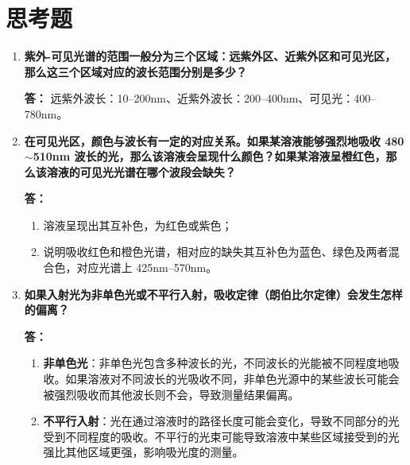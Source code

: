 \section{思考题}

\begin{enumerate}[label=\arabic*、, leftmargin=4em, labelsep=0pt]

    \item \textbf{紫外-可见光谱的范围一般分为三个区域：远紫外区、近紫外区和可见光区，那么这三个区域对应的波长范围分别是多少？}

    \textbf{答：} 远紫外波长：10--200nm、近紫外波长：200--400nm、可见光：400--780nm。

    \item \textbf{在可见光区，颜色与波长有一定的对应关系。如果某溶液能够强烈地吸收 480$\sim$510nm 波长的光，那么该溶液会呈现什么颜色？如果某溶液呈橙红色，那么该溶液的可见光光谱在哪个波段会缺失？}

    \textbf{答：}
    \begin{enumerate}[label=(\arabic*), leftmargin=3em]
        \item 溶液呈现出其互补色，为红色或紫色；
        \item 说明吸收红色和橙色光谱，相对应的缺失其互补色为蓝色、绿色及两者混合色，对应光谱上 425nm--570nm。
    \end{enumerate}

    \item \textbf{如果入射光为非单色光或不平行入射，吸收定律（朗伯比尔定律）会发生怎样的偏离？}

    \textbf{答：}
    \begin{enumerate}[label=(\arabic*), leftmargin=3em]
        \item \textbf{非单色光}：非单色光包含多种波长的光，不同波长的光能被不同程度地吸收。如果溶液对不同波长的光吸收不同，非单色光源中的某些波长可能会被强烈吸收而其他波长则不会，导致测量结果偏离。
        \item \textbf{不平行入射}：光在通过溶液时的路径长度可能会变化，导致不同部分的光受到不同程度的吸收。不平行的光束可能导致溶液中某些区域接受到的光强比其他区域更强，影响吸光度的测量。
    \end{enumerate}

\end{enumerate}